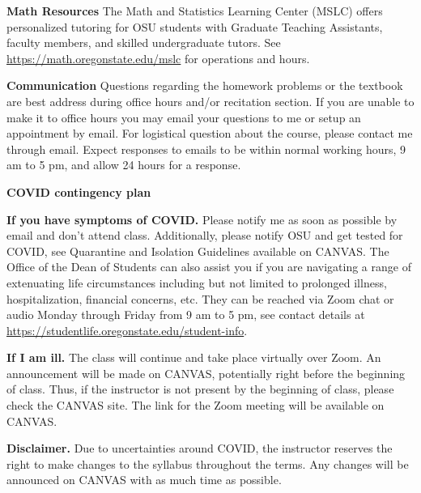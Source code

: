 \documentclass{article}
\begin{document}
\bigskip

\noindent \textbf{Math Resources} The Math and Statistics Learning Center (MSLC) offers personalized tutoring for OSU students with Graduate Teaching Assistants, faculty members, and skilled undergraduate tutors. See \href{https://math.oregonstate.edu/mslc}{https://math.oregonstate.edu/mslc} for operations and hours.

\bigskip

\noindent \textbf{Communication} Questions regarding the homework problems or the textbook are best address during office hours and/or recitation section. If you are unable to make it to office hours you may email your questions to me or setup an appointment by email. For logistical question about the course, please contact me through email. Expect responses to emails to be within normal working hours, 9 am to 5 pm, and allow 24 hours for a response.

\bigskip

\begin{large}
\noindent \textbf{COVID contingency plan}
\end{large}

\bigskip

\noindent \textbf{If you have symptoms of COVID.} Please notify me as soon as possible by email and don't attend class. Additionally, please notify OSU and get tested for COVID, see Quarantine and Isolation Guidelines available on CANVAS. The Office of the Dean of Students can also assist you if you are navigating a range of extenuating life circumstances including but not limited to prolonged illness, hospitalization, financial concerns, etc. They can be reached via Zoom chat or audio Monday through Friday from 9 am to 5 pm, see contact details at \href{https://studentlife.oregonstate.edu/student-info}{https://studentlife.oregonstate.edu/student-info}.

\bigskip

\noindent \textbf{If I am ill.} The class will continue and take place virtually over Zoom. An announcement will be made on CANVAS, potentially right before the beginning of class. Thus, if the instructor is not present by the beginning of class, please check the CANVAS site. The link for the Zoom meeting will be available on CANVAS.

\bigskip

\noindent \textbf{Disclaimer.} Due to uncertainties around COVID, the instructor reserves the right to make changes to the syllabus throughout the terms. Any changes will be announced on CANVAS with as much time as possible.
\end{document}
